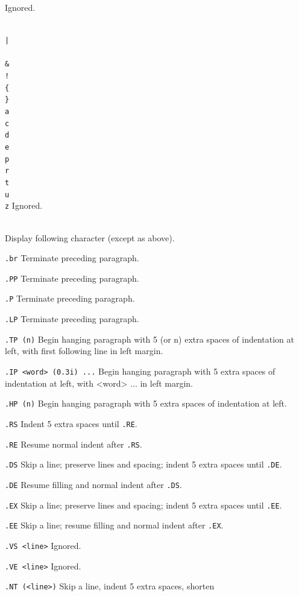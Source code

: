 			Ignored.
\item{\tt \\| \\\^ \\\& \\! \\\{ \\\} \\a \\c \\d \\e \\p \\r \\t \\u \\z}
			Ignored.
\item{\tt \\}		Display following character (except as above).
\item{\tt .br}		Terminate preceding paragraph.
\item{\tt .PP}		Terminate preceding paragraph.
\item{\tt .P}		Terminate preceding paragraph.
\item{\tt .LP}		Terminate preceding paragraph.
\item{\tt .TP~(n)}	Begin hanging paragraph with 5 (or n) extra
			spaces of indentation at left, with first
			following line in left margin.
\item{\tt .IP~<word>~(0.3i)~...}
			Begin hanging paragraph with 5 extra
			spaces of indentation at left, with <word> ...
			in left margin.
\item{\tt .HP~(n)}	Begin hanging paragraph with 5 extra
			spaces of indentation at left.
\item{\tt .RS}		Indent 5 extra spaces until {\tt .RE}.
\item{\tt .RE}		Resume normal indent after {\tt .RS}.
\item{\tt .DS}		Skip a line; preserve lines and spacing;
			indent 5 extra spaces until {\tt .DE}.
\item{\tt .DE}		Resume filling and normal indent after {\tt .DS}.
\item{\tt .EX}		Skip a line; preserve lines and spacing;
			indent 5 extra spaces until {\tt .EE}.
\item{\tt .EE}		Skip a line; resume filling and normal indent
			after {\tt .EX}.
\item{\tt .VS~<line>}	Ignored.
\item{\tt .VE~<line>}	Ignored.
\item{\tt .NT~(<line>)}	Skip a line, indent 5 extra spaces, shorten
